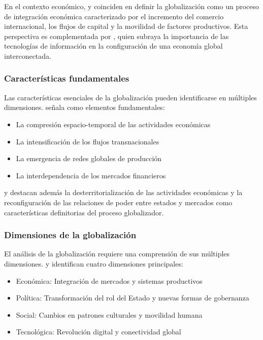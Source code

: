 \documentclass[12pt, a4paper]{article}
\begin{document}
En el contexto económico, \textcite{krugman2018} y \textcite{sassen2007} coinciden en definir la globalización como un proceso de integración económica caracterizado por el incremento del comercio internacional, los flujos de capital y la movilidad de factores productivos. Esta perspectiva es complementada por \textcite{castells2010}, quien subraya la importancia de las tecnologías de información en la configuración de una economía global interconectada.

\subsubsection{Características fundamentales}
Las características esenciales de la globalización pueden identificarse en múltiples dimensiones. \textcite{dicken2015} señala como elementos fundamentales:
\begin{itemize}
    \item La compresión espacio-temporal de las actividades económicas
    \item La intensificación de los flujos transnacionales
    \item La emergencia de redes globales de producción
    \item La interdependencia de los mercados financieros
\end{itemize}

\textcite{scholte2005} y \textcite{harvey2009} destacan además la desterritorialización de las actividades económicas y la reconfiguración de las relaciones de poder entre estados y mercados como características definitorias del proceso globalizador.

\subsubsection{Dimensiones de la globalización}
El análisis de la globalización requiere una comprensión de sus múltiples dimensiones. \textcite{keohane2018} y \textcite{nye2020} identifican cuatro dimensiones principales:
\begin{itemize}
    \item Económica: Integración de mercados y sistemas productivos
    \item Política: Transformación del rol del Estado y nuevas formas de gobernanza
    \item Social: Cambios en patrones culturales y movilidad humana
    \item Tecnológica: Revolución digital y conectividad global
\end{itemize}
\end{document}
